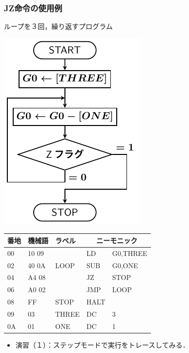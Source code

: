 \documentclass[handout]{beamer}        %
\begin{document}
\begin{frame}
  \frametitle{JZ命令の使用例}
  ループを３回，繰り返すプログラム\\
  \vfill
  \begin{minipage}{0.4\columnwidth}
    \centerline{\includegraphics[scale=0.7]{../Tikz/flow0B.pdf}}
  \end{minipage}
  \begin{minipage}{0.59\columnwidth}
    {\ttfamily\small\begin{center}
      \begin{tabular}{|l|l|l|l l|} \hline
        番地 & 機械語 & ラベル & \multicolumn{2}{|c|}{ニーモニック} \\
        \hline
        00 & 10 09 &           & LD   & G0,THREE              \\
        02 & 40 0A &  LOOP     & SUB  & G0,ONE                \\
        04 & A4 08 &           & JZ   & STOP                  \\
        06 & A0 02 &           & JMP  & LOOP                  \\
        08 & FF    &  STOP     & HALT &                       \\
        09 & 03    &  THREE    & DC   & 3                     \\
        0A & 01    &  ONE      & DC   & 1                     \\
        \hline
      \end{tabular}
    \end{center}}
  \end{minipage}
  \vfill
  \begin{itemize}
  \item 演習（１）：ステップモードで実行をトレースしてみる．
  \end{itemize}
\end{frame}
\end{document}
